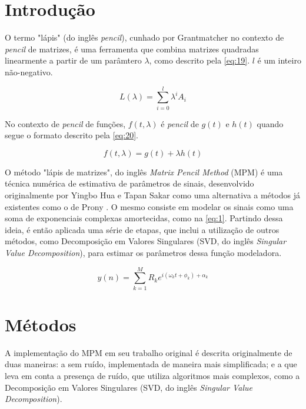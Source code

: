 \documentclass[12pt]{article}
\begin{document}
\section{Introdução}

O termo "lápis" (do inglês \textit{pencil}), cunhado por Grantmatcher \cite{} no contexto de \textit{pencil} de matrizes, é uma ferramenta que combina matrizes 
quadradas linearmente a partir de um parâmtero $\lambda$, como descrito pela \autoref{eq:19}. $l$ é um inteiro não-negativo.

\begin{equation} \label{eq:19}
    L(\lambda) = \sum_{i = 0}^{l} \lambda^i A_i
\end{equation}

No contexto de \textit{pencil} de funções, $f(t, \lambda)$ é \textit{pencil} de $g(t)$ e $h(t)$ quando segue o formato descrito pela \autoref{eq:20}.

\begin{equation} \label{eq:20}
    f(t, \lambda) = g(t) + \lambda h(t)
\end{equation}

O método "lápis de matrizes", do inglês \textit{Matrix Pencil Method} (MPM) é uma técnica numérica
de estimativa de parâmetros de sinais, desenvolvido originalmente por Yingbo Hua e Tapan Sakar \cite{370583} como uma alternativa a métodos já existentes 
como o de Prony \cite{49090}. O mesmo consiste em modelar os sinais como uma soma de exponenciais complexas amortecidas, como na \autoref{eq:1}. Partindo 
dessa ideia, é então aplicada uma série de etapas, que inclui a utilização de outros métodos, como Decomposição em Valores Singulares (SVD, do inglês \textit{Singular Value Decomposition}), 
para estimar os parâmetros dessa função modeladora.  

\begin{equation} \label{eq:1}
    y(n) = \sum_{k=1}^{M} R_k e^{i (\omega_k t + \phi_k) + \alpha_k }
\end{equation}

\section{Métodos}

A implementação do MPM em seu trabalho original é descrita originalmente de duas maneiras: a sem ruído, 
implementada de maneira mais simplificada; e a que leva em conta a presença de ruído, que utiliza algoritmos mais complexos, como a
Decomposição em Valores Singulares (SVD, do inglês \textit{Singular Value Decomposition}).
\end{document}

